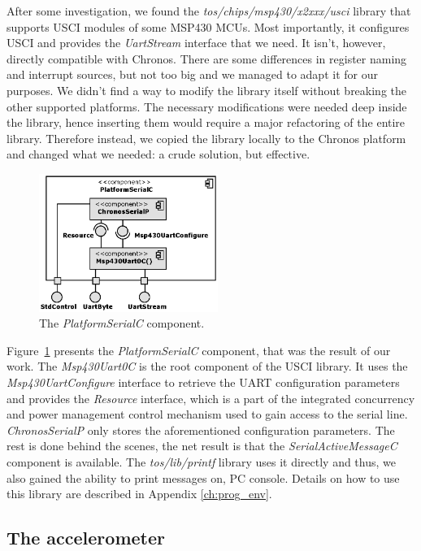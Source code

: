 After some investigation, we found the \emph{tos/chips/msp430/x2xxx/usci} library that supports USCI modules of some MSP430 MCUs. Most importantly, it configures USCI and provides the \emph{UartStream} interface that we need. It isn't, however, directly compatible with Chronos. There are some differences in register naming and interrupt sources, but not too big and we managed to adapt it for our purposes. We didn't find a way to modify the library itself without breaking the other supported platforms. The necessary modifications were needed deep inside the library, hence inserting them would require a major refactoring of the entire library. Therefore instead, we copied the library locally to the Chronos platform and changed what we needed: a crude solution, but effective.

\begin{figure}[h]
  \centering
  \includegraphics[width=0.52\textwidth]{diagrams/platform_serial_c.eps}
  \caption{The \emph{PlatformSerialC} component.}
  \label{fig:platform_serial_c}
\end{figure}

Figure~\ref{fig:platform_serial_c} presents the \emph{PlatformSerialC} component, that was the result of our work. The \emph{Msp430Uart0C} is the root component of the USCI library. It uses the \emph{Msp430UartConfigure} interface to retrieve the UART configuration parameters and provides the \emph{Resource} interface, which is a part of the integrated concurrency and power management control mechanism used to gain access to the serial line. \emph{ChronosSerialP} only stores the aforementioned configuration parameters. The rest is done behind the scenes, the net result is that the \emph{SerialActiveMessageC} component is available. The \emph{tos/lib/printf} library uses it directly and thus, we also gained the ability to print messages on, PC console. Details on how to use this library are described in Appendix \ref{ch:prog_env}.

\subsection{The accelerometer}
\label{ch:accelerometer}

